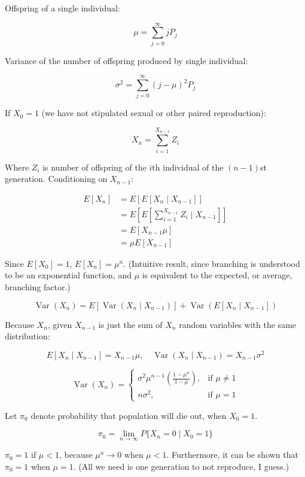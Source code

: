 \documentclass{article}
\DeclareMathOperator{\Var}{Var}
\begin{document}
Offspring of a single individual:

\[
    \mu = \sum_{j=0}^\infty j P_j
\]

Variance of the number of offspring produced by single individual:

\[
    \sigma^2 = \sum_{j=0}^\infty (j - \mu)^2P_j
\]

If $X_0 = 1$ (we have not stipulated sexual or other paired reproduction):

\[
    X_n = \sum_{i=1}^{X_{n-1}}Z_i
\]

Where $Z_i$ is number of offspring of the $i$th individual of the
$(n-1)$st generation. Conditioning on $X_{n-1}$:

\begin{align*}
    E[X_n] & = E[E[X_n \mid X_{n-1}]] \\
           & = E\left[E\left[\sum_{i=1}^{X_{n-1}}Z_i \mid X_{n-1} \right]\right] \\
           & = E[X_{n-1}\mu] \\
           & = \mu E[X_{n-1}]
\end{align*}

Since $E[X_0] = 1$, $E[X_n] = \mu^n$. (Intuitive result, since branching
is understood to be an exponential function, and $\mu$ is equivalent to
the expected, or average, branching factor.)

\[
    \Var(X_n) = E[\Var(X_n \mid X_{n-1})] + \Var(E[X_n \mid X_{n-1}])
\]

Because $X_n$, given $X_{n-1}$ is just the sum of $X_n$ random variables
with the same distribution:

\[
    E[X_n \mid X_{n-1}] = X_{n-1}\mu, \quad
    \Var(X_n \mid X_{n-1}) = X_{n-1}\sigma^2
\]


\[
    \Var(X_n) =
    \begin{cases}
        \sigma^2\mu^{n-1}\left(\frac{1-\mu^n}{1-\mu}\right),
            & \text{if }\mu \ne 1 \\
        n\sigma^2,
            & \text{if }\mu = 1
    \end{cases}
\]

Let $\pi_0$ denote probability that population will die out, when
$X_0=1$.

\[
    \pi_0 = \lim_{n\to\infty} P \{X_n = 0 \mid X_0 = 1\}
\]

$\pi_0 = 1$ if $\mu < 1$, because $\mu^n\to0$ when $\mu < 1$.
Furthermore, it can be shown that $\pi_0 = 1$ when $\mu=1$. (All we need
is one generation to not reproduce, I guess.)
\end{document}
